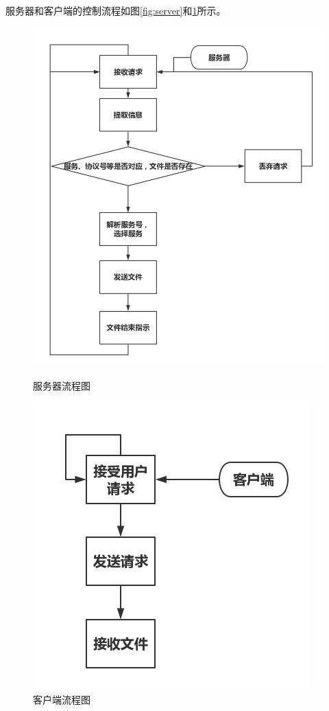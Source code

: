 \documentclass[15pt]{ctexart}
\begin{document}
\par 服务器和客户端的控制流程如图\ref{fig:server}和\ref{fig:client}所示。
\begin{figure}[H]
	\begin{minipage}{0.5\linewidth}
		\flushleft
		\includegraphics[width=1.1\linewidth]{imgs/server.png}
		\caption{服务器流程图}
		\label{fig:server}
	\end{minipage}
	\begin{minipage}{0.45\linewidth}
		\flushright
		\includegraphics[width=1\linewidth]{imgs/client.png}
		\caption{客户端流程图}
		\label{fig:client}
	\end{minipage}
\end{figure}
\end{document}
